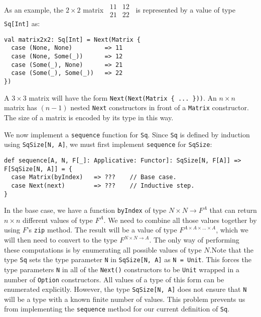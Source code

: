 As an example, the $2\times2$ matrix $\,\begin{array}{|cc|}
11 & 12\\
21 & 22
\end{array}\,$ is represented by a value of type \lstinline!Sq[Int]! as:\vspace{0.2\baselineskip}

\begin{lstlisting}
val matrix2x2: Sq[Int] = Next(Matrix {
  case (None, None)         => 11
  case (None, Some(_))      => 12
  case (Some(_), None)      => 21
  case (Some(_), Some(_))   => 22
})
\end{lstlisting}

A $3\times3$ matrix will have the form \lstinline!Next(Next(Matrix { ... }))!.
An $n\times n$ matrix has $\left(n-1\right)$ nested \lstinline!Next!
constructors in front of a \lstinline!Matrix! constructor. The size
of a matrix is encoded by its type in this way.

We now implement a \lstinline!sequence! function for \lstinline!Sq!.
Since \lstinline!Sq! is defined by induction using \lstinline!SqSize[N, A]!,
we must first implement \lstinline!sequence! for \lstinline!SqSize!:
\begin{lstlisting}
def sequence[A, N, F[_]: Applicative: Functor]: SqSize[N, F[A]] => F[SqSize[N, A]] = {
  case Matrix(byIndex)   => ???    // Base case.
  case Next(next)        => ???    // Inductive step.
}
\end{lstlisting}
In the base case, we have a function \lstinline!byIndex! of type
$N\times N\rightarrow F^{A}$ that can return $n\times n$ different
values of type $F^{A}$. We need to combine all those values together
by using $F$\textsf{'}s \lstinline!zip! method. The result will be a value
of type $F^{A\times A\times...\times A}$, which we will then need
to convert to the type $F^{N\times N\rightarrow A}$. The only way
of performing these computations is by enumerating all possible values
of type $N$.Note that the type \lstinline!Sq! sets the type parameter
\lstinline!N! in \lstinline!SqSize[N, A]! as \lstinline!N = Unit!.
This forces the type parameters \lstinline!N! in all of the \lstinline!Next()!
constructors to be \lstinline!Unit! wrapped in a number of \lstinline!Option!
constructors. All values of a type of this form can be enumerated
explicitly. However, the type \lstinline!SqSize[N, A]! does not ensure
that \lstinline!N! will be a type with a known finite number of values.
This problem prevents us from implementing the \lstinline!sequence!
method for our current definition of \lstinline!Sq!.

